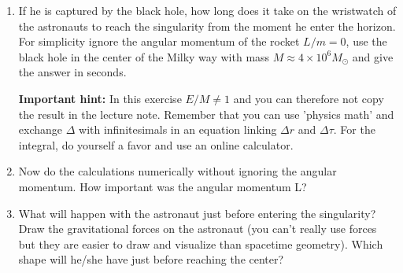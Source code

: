 {\begin{multicols}{2}
\begin{enumerate}
\item If he is captured by the black hole, how long does it take on the wristwatch of the astronauts to reach the singularity from the moment he enter the horizon. For simplicity ignore the angular momentum of the rocket $L/m=0$, use the black hole in the center of the Milky way with mass $M\approx4\times10^6M_\odot$ and give the answer in seconds.

{\bf Important hint:} In this exercise $E/M \neq 1$ and you can therefore not copy the result in the lecture note. Remember that you can use 'physics math' and exchange $\Delta$ with infinitesimals in an equation linking $\Delta r$ and $\Delta \tau$. For the integral, do yourself a favor and use an online calculator.

\item Now do the calculations numerically without ignoring the angular momentum. How important was the angular momentum L?

\item What will happen with the astronaut just before entering the singularity? Draw the gravitational forces on the astronaut (you can't really use forces but they are easier to draw and visualize than spacetime geometry). Which shape will he/she have just before reaching the center?
\end{enumerate}

\vspace{0.5cm}



\end{multicols}}
